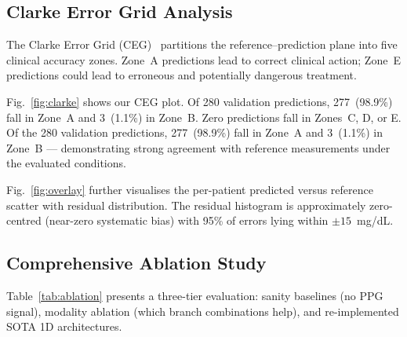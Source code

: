 \documentclass[conference]{IEEEtran}
\begin{document}
\subsection{Clarke Error Grid Analysis}
The Clarke Error Grid (CEG)~\cite{clarke1987} partitions the reference--prediction
plane into five clinical accuracy zones.  Zone~A predictions lead to correct
clinical action; Zone~E predictions could lead to erroneous and potentially
dangerous treatment.

Fig.~\ref{fig:clarke} shows our CEG plot.  Of 280 validation predictions,
277~(98.9\%) fall in Zone~A and 3~(1.1\%) in Zone~B.  Zero predictions fall
in Zones~C, D, or E.  Of the 280 validation predictions, 277~(98.9\%) fall in Zone~A and 3~(1.1\%)
in Zone~B --- demonstrating strong agreement with reference measurements under
the evaluated conditions.

Fig.~\ref{fig:overlay} further visualises the per-patient predicted versus
reference scatter with residual distribution.  The residual histogram is
approximately zero-centred (near-zero systematic bias) with 95\% of errors
lying within $\pm15$~mg/dL.

\subsection{Comprehensive Ablation Study}
\label{sec:ablation}

Table~\ref{tab:ablation} presents a three-tier evaluation: sanity baselines
(no PPG signal), modality ablation (which branch combinations help), and
re-implemented SOTA 1D architectures.
\end{document}
